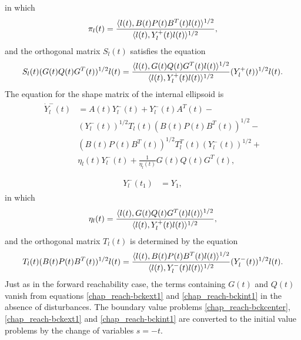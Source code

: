 \documentclass[letterpaper,10pt,english]{sphinxmanual}
\begin{document}
in which
\begin{gather}
\begin{split}\pi_l(t) = \frac{\langle l(t),
B(t)P(t)B^T(t)l(t)\rangle^{1/2}}{\langle l(t),
Y^+_l(t)l(t)\rangle^{1/2}},\end{split}\notag
\end{gather}
and the orthogonal matrix \(S_l(t)\) satisfies the equation
\begin{gather}
\begin{split}S_l(t)(G(t)Q(t)G^T(t))^{1/2}l(t) = \frac{\langle l(t),
G(t)Q(t)G^T(t)l(t)\rangle^{1/2}}{\langle l(t),
Y_l^+(t)l(t)\rangle^{1/2}}(Y_l^{+}(t))^{1/2}l(t).\end{split}\notag
\end{gather}
The equation for the shape matrix of the internal ellipsoid is
\label{chap_reach:equation-bckint1}\begin{gather}
\begin{split}\dot{Y}^-_l(t) & =  A(t)Y^-_l(t) + Y^-_l(t)A^T(t) -\nonumber \\
& (Y_l^{-}(t))^{1/2}T_l(t)(B(t)P(t)B^T(t))^{1/2} -\nonumber \\
& (B(t)P(t)B^T(t))^{1/2}T_l^T(t)(Y_l^{-}(t))^{1/2} +\nonumber \\
& \eta_l(t)Y^-_l(t) + \frac{1}{\eta_l(t)}G(t)Q(t)G^T(t),\\\end{split}\label{chap_reach-bckint1}
\end{gather}\label{chap_reach:equation-bckint2}\begin{gather}
\begin{split}Y^-_l(t_1) & = Y_1,\end{split}\label{chap_reach-bckint2}
\end{gather}
in which
\begin{gather}
\begin{split}\eta_l(t) = \frac{\langle l(t),
G(t)Q(t)G^T(t)l(t)\rangle^{1/2}}{\langle l(t),
Y^+_l(t)l(t)\rangle^{1/2}},\end{split}\notag
\end{gather}
and the orthogonal matrix \(T_l(t)\) is determined by the equation
\begin{gather}
\begin{split}T_l(t)(B(t)P(t)B^T(t))^{1/2}l(t) = \frac{\langle l(t),
B(t)P(t)B^T(t)l(t)\rangle^{1/2}}{\langle l(t),
Y_l^-(t)l(t)\rangle^{1/2}}(Y_l^{-}(t))^{1/2}l(t).\end{split}\notag
\end{gather}
Just as in the forward reachability case, the terms containing
\(G(t)\) and \(Q(t)\) vanish from equations \eqref{chap_reach-bckext1} and
\eqref{chap_reach-bckint1} in the absence of disturbances. The boundary value problems
\eqref{chap_reach-bckcenter}, \eqref{chap_reach-bckext1} and \eqref{chap_reach-bckint1} are converted to the initial
value problems by the change of variables \(s = -t\).
\end{document}
